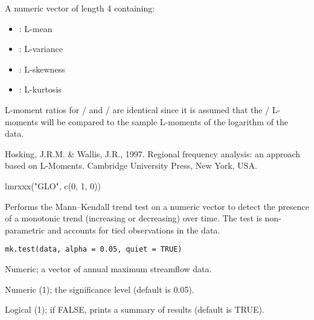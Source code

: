 \documentclass[a4paper]{book}
\begin{document}
%
\begin{Value}
A numeric vector of length 4 containing:
\begin{itemize}

\item{} : L-mean
\item{} : L-variance
\item{} : L-skewness
\item{} : L-kurtosis

\end{itemize}

\end{Value}
%
\begin{Note}
L-moment ratios for / and / are identical
since it is assumed that the / L-moments will be compared
to the sample L-moments of the logarithm of the data.
\end{Note}
%
\begin{References}
Hosking, J.R.M. \& Wallis, J.R., 1997. Regional frequency analysis: an approach based
on L-Moments. Cambridge University Press, New York, USA.
\end{References}
%
\begin{Examples}
\begin{ExampleCode}
lmrxxx("GLO", c(0, 1, 0))

\end{ExampleCode}
\end{Examples}
%
\begin{Description}
Performs the Mann–Kendall trend test on a numeric vector to detect the presence
of a monotonic trend (increasing or decreasing) over time. The test is non-parametric
and accounts for tied observations in the data.
\end{Description}
%
\begin{Usage}
\begin{verbatim}
mk.test(data, alpha = 0.05, quiet = TRUE)
\end{verbatim}
\end{Usage}
%
\begin{Arguments}
\begin{ldescription}
\item[\code{data}] Numeric; a vector of annual maximum streamflow data.

\item[\code{alpha}] Numeric (1); the significance level (default is 0.05).

\item[\code{quiet}] Logical (1); if FALSE, prints a summary of results (default is TRUE).
\end{ldescription}
\end{Arguments}
\end{document}
